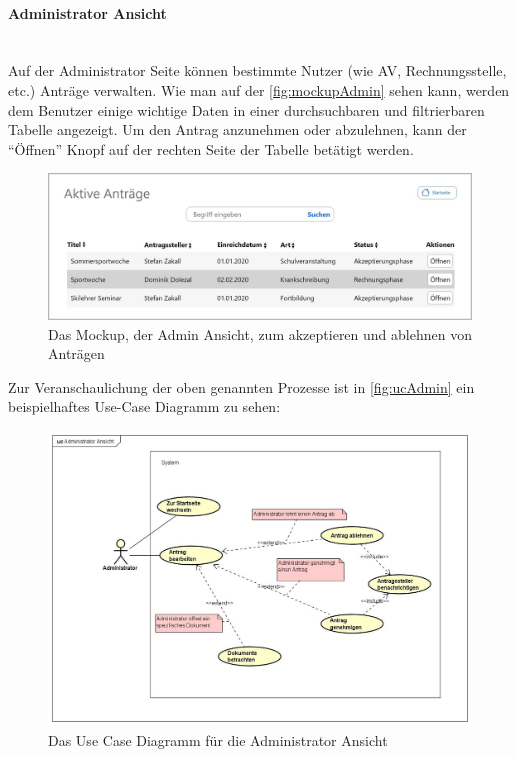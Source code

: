 \paragraph{Administrator Ansicht}
~\\
Auf der Administrator Seite können bestimmte Nutzer (wie AV, Rechnungsstelle, etc.) Anträge verwalten. Wie man auf der \autoref{fig:mockupAdmin} sehen kann, werden dem Benutzer einige wichtige Daten in einer durchsuchbaren und filtrierbaren Tabelle angezeigt. Um den Antrag anzunehmen oder abzulehnen, kann der \enquote{Öffnen} Knopf auf der rechten Seite der Tabelle betätigt werden.
\begin{figure}[H]
	\centering
	\includegraphics[width=1\linewidth]{images/Mockup-Admin}
	\caption[Mockup Adminansicht]{Das Mockup, der Admin Ansicht, zum akzeptieren und ablehnen von Anträgen}
	\label{fig:mockupAdmin}
\end{figure}
Zur Veranschaulichung der oben genannten Prozesse ist in \autoref{fig:ucAdmin} ein beispielhaftes Use-Case Diagramm zu sehen: 
\begin{figure}[H]
	\centering
	\includegraphics[width=1\linewidth]{images/uc-admin}
	\caption[Use Case Diagramm Adminansicht]{Das Use Case Diagramm für die Administrator Ansicht}
	\label{fig:ucAdmin}
\end{figure}
